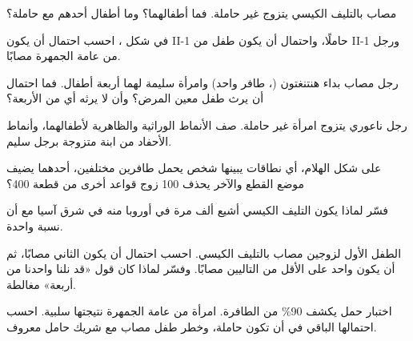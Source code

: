 \begin{exercise}[$\star\star$]\label{exo:g11:genes-and-disease:6}
مصاب بالتليف الكيسي يتزوج غير حاملة. فما أطفالهما؟ وما أطفال أحدهم مع
حاملة؟
\end{exercise}

\begin{exercise}[$\star\star$]\label{exo:g11:genes-and-disease:7}
في شكل ، احسب احتمال أن يكون II-1 حاملًا، واحتمال أن يكون
طفل من II-1 ورجل من عامة الجمهرة مصابًا.
\end{exercise}

\begin{exercise}[$\star\star$]\label{exo:g11:genes-and-disease:8}
رجل مصاب بداء هنتنغتون (،  طافر واحد) وامرأة سليمة لهما أربعة
أطفال. فما احتمال أن يرث طفل معين المرض؟ وأن لا يرثه أي من الأربعة؟
\end{exercise}

\begin{exercise}[$\star\star$]\label{exo:g11:genes-and-disease:9}
رجل ناعوري يتزوج امرأة غير حاملة. صف الأنماط الوراثية والظاهرية
لأطفالهما، وأنماط الأحفاد من ابنة متزوجة برجل سليم.
\end{exercise}

\begin{exercise}[$\star\star$]\label{exo:g11:genes-and-disease:10}
على شكل الهلام، أي نطاقات يبينها شخص يحمل  طافرين مختلفين،
أحدهما يضيف موضع القطع والآخر يحذف 100 زوج قواعد أخرى من قطعة 400؟
\end{exercise}

\begin{exercise}[$\star\star$]\label{exo:g11:genes-and-disease:11}
فسّر لماذا يكون التليف الكيسي أشيع ألف مرة في أوروبا منه في شرق آسيا
مع أن نسبة  واحدة.
\end{exercise}

\begin{exercise}[$\star\star\star$]\label{exo:g11:genes-and-disease:12}
الطفل الأول لزوجين مصاب بالتليف الكيسي. احسب احتمال أن يكون الثاني
مصابًا، ثم أن يكون واحد على الأقل من التاليين مصابًا. وفسّر لماذا كان
قول «قد نلنا واحدنا من أربعة» مغالطة.
\end{exercise}

\begin{exercise}[$\star\star\star$]\label{exo:g11:genes-and-disease:13}
اختبار حمل يكشف 90\% من  الطافرة. امرأة من عامة الجمهرة نتيجتها
سلبية. احسب احتمالها الباقي في أن تكون حاملة، وخطر طفل مصاب مع شريك
حامل معروف.
\end{exercise}


